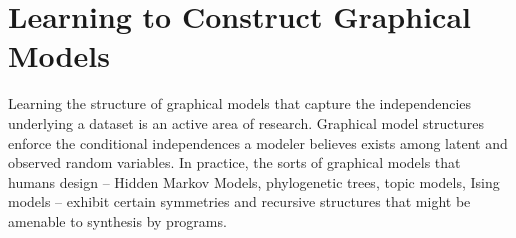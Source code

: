 \documentclass{article} %
\begin{document}

\section{Learning to Construct Graphical Models}

Learning the structure of graphical models that capture the independencies underlying a dataset is an active area of research\cite{adams-wallach-ghahramani-2010a}\cite{ISI:000240797500002}\cite{ISI:000178037200004}\cite{DBLP:journals/corr/abs-1302-6815}. Graphical model structures enforce the conditional independences a modeler believes exists among latent and observed random variables\cite{DBLP:books/daglib/0066829}.
In practice, the sorts of graphical models that humans design -- Hidden Markov Models, phylogenetic trees, topic models, Ising models -- exhibit certain symmetries and recursive structures that might be amenable to synthesis by programs.
\end{document}
